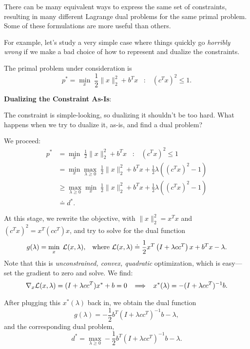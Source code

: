 \documentclass[12pt]{article}
\begin{document}
There can be many equivalent ways to express the same set of constraints, resulting in many different Lagrange dual problems for the same primal problem. Some of these formulations are more useful than others. 

For example, let's study a very simple case where things quickly go \textit{horribly wrong} if we make a bad choice of how to represent and dualize the constraints.

\begin{example}
The primal problem under consideration is
%
\begin{equation}
p^* = \min_x\; \frac{1}{2} \|x\|_2^2 + b^T x \;\;\; : \;\;\;  (c^T x)^2 \leq 1. 
\end{equation}

\textbf{Dualizing the Constraint As-Is}:

The constraint is simple-looking, so dualizing it shouldn't be too hard. What happens when we try to dualize it, as-is, and find a dual problem?

We proceed:
%
\begin{align*}
p^* &= \min_x \;\frac{1}{2} \|x\|_2^2 + b^T x \;\;\; : \;\;\;  (c^T x)^2 \leq 1 \\
&= \min_x \max_{\lambda \geq 0} \; \frac{1}{2} \|x\|_2^2 + b^T x + \frac{1}{2} \lambda \left( (c^T x)^2 - 1 \right) \\
&\geq \max_{\lambda \geq 0} \min_x  \; \frac{1}{2} \|x\|_2^2 + b^T x + \frac{1}{2} \lambda \left( (c^T x)^2 - 1 \right) \\
&\doteq d^*.
\end{align*}

At this stage, we rewrite the objective, with $\|x\|_2^2 = x^T x$ and $(c^T x)^2 = x^T (c c^T ) x$, and try to solve for the dual function
%
\begin{equation*}
g(\lambda) = \min_x \; {\mathcal L}(x,\lambda), \;\;\; \text{where } {\mathcal L}(x,\lambda) \doteq \frac{1}{2} x^T \left( I + \lambda c c ^T \right) x + b^T x - \lambda.
\end{equation*}
%
Note that this is \textit{unconstrained, convex, quadratic} optimization, which is easy---set the gradient to zero and solve. We find:
%
\begin{equation*}
\nabla_x {\mathcal L}(x,\lambda) = (I + \lambda c c ^T) x^* + b = 0 \;\;\; \Longrightarrow \;\;\; x^* (\lambda) = - (I + \lambda c c^T)^{-1} b.
\end{equation*}

After plugging this $x^* (\lambda)$ back in, we obtain the dual function
%
\begin{equation*}
g(\lambda) = - \frac{1}{2} b^T (I + \lambda c c^T)^{-1} b - \lambda,
\end{equation*}
%
and the corresponding dual problem,
%
\begin{equation*}
d^* = \max_{\lambda \geq 0} - \frac{1}{2} b^T (I + \lambda c c^T)^{-1} b - \lambda.
\end{equation*}


\end{example}
\end{document}
